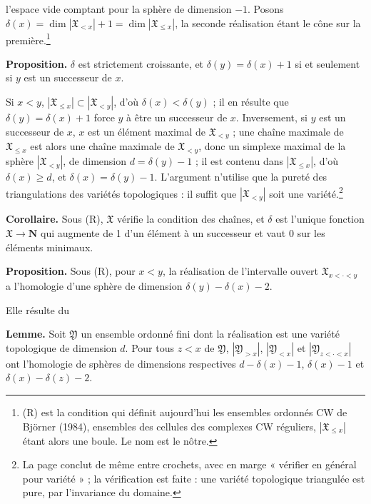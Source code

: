 \documentclass[11pt,a4paper]{article}
\begin{document}
l'espace vide comptant pour la sphère de dimension $-1$. Posons
$\delta(x) = \dim |\mathfrak{X}_{<x}| + 1 = \dim |\mathfrak{X}_{\leq x}|$, la
seconde réalisation étant le cône sur la première.\footnote{(R) est la
condition qui définit aujourd'hui les ensembles ordonnés CW de Björner (1984),
ensembles des cellules des complexes CW réguliers, $|\mathfrak{X}_{\leq x}|$
étant alors une boule. Le nom est le nôtre.}

\textbf{Proposition.} $\delta$ est strictement croissante, et
$\delta(y) = \delta(x) + 1$ si et seulement si $y$ est un successeur de $x$.

Si $x < y$, $|\mathfrak{X}_{\leq x}| \subset |\mathfrak{X}_{<y}|$, d'où
$\delta(x) < \delta(y)$ ; il en résulte que $\delta(y) = \delta(x) + 1$ force $y$
à être un successeur de $x$. Inversement, si $y$ est un successeur de $x$, $x$ est
un élément maximal de $\mathfrak{X}_{<y}$ ; une chaîne maximale de
$\mathfrak{X}_{\leq x}$ est alors une chaîne maximale de $\mathfrak{X}_{<y}$, donc
un simplexe maximal de la sphère $|\mathfrak{X}_{<y}|$, de dimension
$d = \delta(y) - 1$ ; il est contenu dans $|\mathfrak{X}_{\leq x}|$, d'où
$\delta(x) \geq d$, et $\delta(x) = \delta(y) - 1$. L'argument n'utilise que la
pureté des triangulations des variétés topologiques : il suffit que
$|\mathfrak{X}_{<y}|$ soit une variété.\footnote{La page conclut de même entre
crochets, avec en marge « vérifier en général pour variété » ; la vérification
est faite : une variété topologique triangulée est pure, par l'invariance du
domaine.}

\textbf{Corollaire.} Sous (R), $\mathfrak{X}$ vérifie la condition des chaînes,
et $\delta$ est l'unique fonction $\mathfrak{X} \to \mathbf{N}$ qui augmente de 1
d'un élément à un successeur et vaut $0$ sur les éléments minimaux.

\textbf{Proposition.} Sous (R), pour $x < y$, la réalisation de l'intervalle
ouvert $\mathfrak{X}_{x < \cdot < y}$ a l'homologie d'une sphère de dimension
$\delta(y) - \delta(x) - 2$.

Elle résulte du

\textbf{Lemme.} Soit $\mathfrak{Y}$ un ensemble ordonné fini dont la
réalisation est une variété topologique de dimension $d$. Pour tous $z < x$ de
$\mathfrak{Y}$, $|\mathfrak{Y}_{>x}|$, $|\mathfrak{Y}_{<x}|$ et
$|\mathfrak{Y}_{z < \cdot < x}|$ ont l'homologie de sphères de dimensions
respectives $d - \delta(x) - 1$, $\delta(x) - 1$ et $\delta(x) - \delta(z) - 2$.
\end{document}
